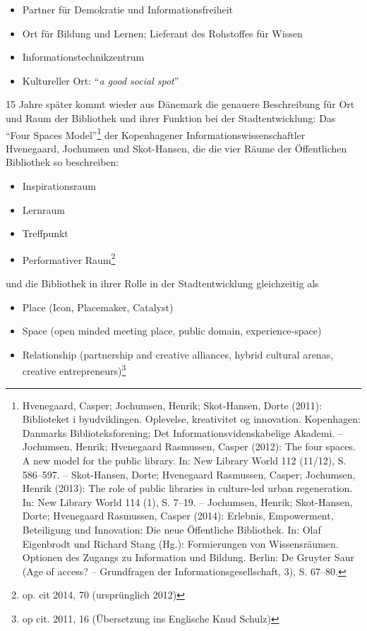 \begin{flushleft}
\begin{itemize}
\item
  Partner für Demokratie und Informationsfreiheit
\item
  Ort für Bildung und Lernen; Lieferant des Rohstoffes für Wissen
\item
  Informationstechnikzentrum
\item
  Kultureller Ort: \enquote{\emph{a good social spot}}
\end{itemize}
\end{flushleft}

15 Jahre später kommt wieder aus Dänemark die genauere Beschreibung für
Ort und Raum der Bibliothek und ihrer Funktion bei der Stadtentwicklung:
Das \enquote{Four Spaces Model}\footnote{Hvenegaard, Casper; Jochumsen,
  Henrik; Skot-Hansen, Dorte (2011): Biblioteket i byudviklingen.
  Oplevelse, kreativitet og innovation. Kopenhagen: Danmarks
  Biblioteksforening; Det Informationsvidenskabelige Akademi. --
  Jochumsen, Henrik; Hvenegaard Rasmussen, Casper (2012): The four
  spaces. A new model for the public library. In: New Library World 112
  (11/12), S. 586--597. -- Skot-Hansen, Dorte; Hvenegaard Rasmussen,
  Casper; Jochumsen, Henrik (2013): The role of public libraries in
  culture-led urban regeneration. In: New Library World 114 (1), S.
  7--19. -- Jochumsen, Henrik; Skot-Hansen, Dorte; Hvenegaard Rasmussen,
  Casper (2014): Erlebnis, Empowerment, Beteiligung und Innovation: Die
  neue Öffentliche Bibliothek. In: Olaf Eigenbrodt und Richard Stang
  (Hg.): Formierungen von Wissensräumen. Optionen des Zugangs zu
  Information und Bildung. Berlin: De Gruyter Saur (Age of access? --
  Grundfragen der Informationsgesellschaft, 3), S. 67--80.} der
Kopenhagener Informationswissenschaftler Hvenegaard, Jochumsen und
Skot-Hansen, die die vier Räume der Öffentlichen Bibliothek so
beschreiben:

\begin{itemize}
\item
  Inspirationsraum
\item
  Lernraum
\item
  Treffpunkt
\item
  Performativer Raum\footnote{op. cit 2014, 70 (ursprünglich 2012)}
\end{itemize}

und die Bibliothek in ihrer Rolle in der Stadtentwicklung gleichzeitig
als

\begin{flushleft}
\begin{itemize}
\item
  Place (Icon, Placemaker, Catalyst)
\item
  Space (open minded meeting place, public domain, experience-space)
\item
  Relationship (partnership and creative alliances, hybrid cultural
  arenas, creative entrepreneurs)\footnote{op cit. 2011, 16 (Übersetzung
    ins Englische Knud Schulz)}
\end{itemize}
\end{flushleft}

